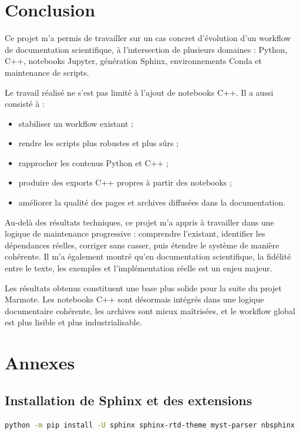 \documentclass[a4paper,12pt,twoside]{article}
\begin{document}
\section{Conclusion}

Ce projet m'a permis de travailler sur un cas concret d'évolution d'un workflow de documentation scientifique, à l'intersection de plusieurs domaines : Python, C++, notebooks Jupyter, génération Sphinx, environnements Conda et maintenance de scripts.

Le travail réalisé ne s'est pas limité à l'ajout de notebooks C++. Il a aussi consisté à :
\begin{itemize}
    \item stabiliser un workflow existant ;
    \item rendre les scripts plus robustes et plus sûrs ;
    \item rapprocher les contenus Python et C++ ;
    \item produire des exports C++ propres à partir des notebooks ;
    \item améliorer la qualité des pages et archives diffusées dans la documentation.
\end{itemize}

Au-delà des résultats techniques, ce projet m'a appris à travailler dans une logique de maintenance progressive : comprendre l'existant, identifier les dépendances réelles, corriger sans casser, puis étendre le système de manière cohérente. Il m'a également montré qu'en documentation scientifique, la fidélité entre le texte, les exemples et l'implémentation réelle est un enjeu majeur.

Les résultats obtenus constituent une base plus solide pour la suite du projet Marmote. Les notebooks C++ sont désormais intégrés dans une logique documentaire cohérente, les archives sont mieux maîtrisées, et le workflow global est plus lisible et plus industrialisable.

\appendix
\section{Annexes}

\subsection{Installation de Sphinx et des extensions}
\label{annexe:sphinx-install}
\begin{lstlisting}[language=bash,caption={Installation de Sphinx et des extensions utiles.}]
python -m pip install -U sphinx sphinx-rtd-theme myst-parser nbsphinx
\end{lstlisting}
\end{document}
